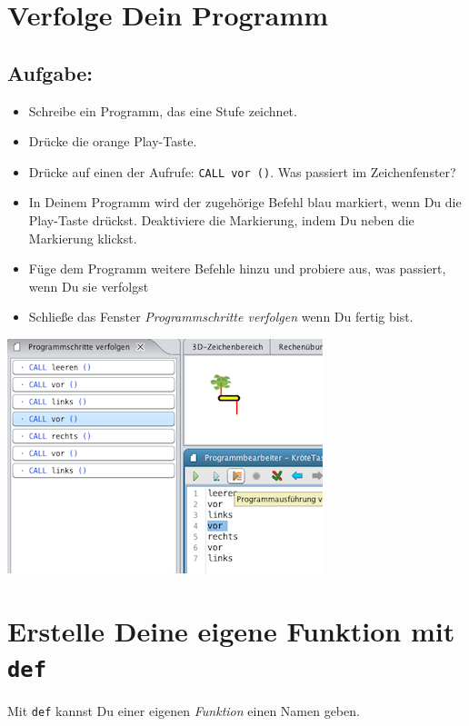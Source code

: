 \chapter{Verfolge Dein Programm}
\begin{multicols}{2}
\section*{\color{BrickRed}Aufgabe:}


\begin{itemize}

\item {Schreibe ein Programm, das eine Stufe zeichnet.}
\item {Drücke die orange Play-Taste.}
\item {Drücke auf einen der Aufrufe: \lstinline{CALL vor ()}. Was passiert im Zeichenfenster?}
\item {In Deinem Programm wird der zugehörige Befehl blau markiert, wenn Du die Play-Taste drückst. Deaktiviere die Markierung, indem Du neben die Markierung klickst. }
\item {Füge dem Programm weitere Befehle hinzu und probiere aus, was passiert, wenn Du sie verfolgst}
\item {Schließe das Fenster {\it Programmschritte verfolgen} wenn Du fertig bist.}

\end{itemize}



\columnbreak

\begin{center}
\includegraphics{../img/trace_de.png}
\end{center}

\end{multicols}

\chapter{Erstelle Deine eigene Funktion mit \lstinline{def}}Mit \lstinline{def} kannst Du einer eigenen {\it Funktion} einen Namen geben.

